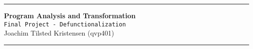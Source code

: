 \documentclass[fleqn, 12pt, a4paper]{article}
\begin{document}
\begin{minipage}[b]{1.0\linewidth}

{\color{KU-red}\hrule}
\vspace*{2ex}
\begin{center}
    {\Large \bf Program Analysis and Transformation} \vspace*{1ex} \\
    {\large \tt Final Project - Defunctionalization} \vspace*{1ex} \\
    { Joachim Tilsted Kristensen (qvp401)}
\end{center}
\vspace*{-6pt}
{\color{KU-red}\hrule}
\end{minipage}
\renewcommand*{\thesection}{\!\!\!\!\!\!\!\!}
\vspace*{-0.8cm}

\newcommand{\forceindent}{\leavevmode{\parindent=1em\indent}}

\def\Var{\ensuremath{\text{\bf Var}}}
\def\Con{\ensuremath{\text{\bf Con}}}
\def\N{\ensuremath{\mathbb N}}
\def\OR{\ensuremath{\ |\ }}
\def\TO{\ensuremath{\rightarrow}}
\def\LB{\ensuremath{\llbracket}}
\def\RB{\ensuremath{\rrbracket}}
\newcommand\LIT[1]{\ensuremath{\text{\tt #1}}}
\newcommand\SLIT[1]{\ \LIT{#1}\ }
\newcommand\IF[3]{\LIT{if}\ #1\ \LIT{then}\ #2\ \LIT{else}\ #3}
\newcommand\INBR[1]{\ensuremath{\llbracket #1 \rrbracket}}
\def\Eval{\ensuremath \downarrow}
\newcommand \BX [1]
  {\scriptsize\framebox{{\raisebox{0pt}[0.7\baselineskip][0.01\baselineskip]{\small #1}}}}

\newcommand\Axiom[2]
                 {\ensuremath{\text{\small #1}:\frac{\displaystyle}
                 {\displaystyle #2}}
                 }
\newcommand\InfOne[3]
                 {\ensuremath{\text{\small #2}:\frac{\displaystyle #1}
                 {\displaystyle #3}}
                 }
\newcommand\InfTwo[4]
                 {\ensuremath{\text{\small #3}:\frac{\displaystyle #1 \quad #2}
                 {\displaystyle #4}}
                 }
\newcommand\InfThree[5]
                 {\ensuremath{\text{\small #4}:
                     \frac{\displaystyle #1 \quad #2 \quad #3}
                          {\displaystyle #5}}
                 }
\newcommand\InfFour[6]
                 {\ensuremath{\text{\small #5}:
                     \frac{\displaystyle #1 \quad #2 \quad #3 \quad #4}
                          {\displaystyle #6}}
                 }
\newcommand\InfFive[7]
                 {\ensuremath{\text{\small #6}:
                     \frac{\displaystyle #1 \quad #2 \quad #3 \quad #4 \quad #5}
                          {\displaystyle #7}}
                 }
\end{document}
